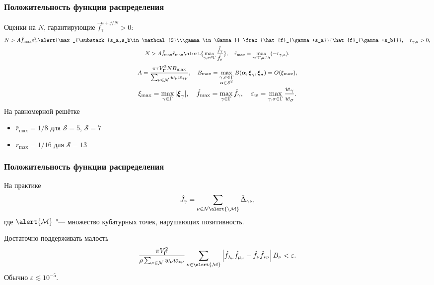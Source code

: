 \documentclass[mathserif]{beamer} %
\newcommand{\bxi}{\boldsymbol{\xi}}
\newcommand{\OO}[1]{O(#1)}
\newcommand{\Nu}{\mathcal{N}}
\newcommand{\Mu}{\mathcal{M}}
\renewcommand{\epsilon}{\varepsilon}
\begin{document}
\begin{frame}
    \frametitle{Положительность функции распределения}
    Оценки на \(N\), гарантирующие \(\hat{f}_\gamma^{n+j/N}>0\):
    \begin{gather*}
        N > A \hat{f}_{\max}\epsilon_w^2 \alert{\max_{\substack{s_a,s_b\in\mathcal{S}\\\gamma\in\Gamma}}
            \frac{\hat{f}_{\gamma+s_a}}{\hat{f}_{\gamma+s_b}}} , \quad r_{\gamma,a} > 0, \\
        N > A \hat{f}_{\max} \bar{r}_{\max} \alert{\max_{\gamma,\sigma\in\Gamma}\frac{\hat{f_\gamma}}{\hat{f_\sigma}}}, \quad
            \bar{r}_{\max} = \max_{\gamma\in\Gamma,a\in\Lambda}( -r_{\gamma,a} ).
    \end{gather*}
    \begin{gather*}
        \footnotesize
        A = \frac{\pi\tau V_\Gamma^2 N B_{\max}}{\sum_{\nu\in\Nu} w_{\nu}w_{*\nu}}, \quad
        B_{\max} = \max_{\substack{\gamma,\sigma\in\Gamma\\\boldsymbol{\alpha}\in S^2}}
            B(\boldsymbol{\alpha}, \bxi_{\gamma}, \bxi_{\sigma}) = \OO{\xi_{\max}}, \\
        \xi_{\max} = \max_{\gamma\in\Gamma}|\bxi_\gamma|, \quad
        \hat{f}_{\max} = \max_{\gamma\in\Gamma} \hat{f}_\gamma, \quad
        \epsilon_w = \max_{\gamma,\sigma\in\Gamma} \frac{w_\gamma}{w_\sigma}.
    \end{gather*}
    \pause
    На равномерной решётке
    \begin{itemize}
        \item \(\bar{r}_{\max}=1/8\) для \(\mathcal{S}=5\), \(\mathcal{S}=7\)
        \item \(\bar{r}_{\max}=1/16\) для \(\mathcal{S}=13\)
    \end{itemize}
\end{frame}

\begin{frame}
    \frametitle{Положительность функции распределения}
    На практике
    \begin{equation}
        \hat{J}_\gamma = \sum_{\nu\in\Nu\alert{\setminus\Mu}} \hat{\Delta}_{\gamma\nu},
    \end{equation}
    где \(\alert{\Mu}\) "--- множество кубатурных точек, нарушающих позитивность.
    \vspace{20pt}\pause

    Достаточно поддерживать малость
    \begin{equation}
        \frac{\pi V_\Gamma^2}{\rho\sum_{\nu\in\Nu} w_{\nu}w_{*\nu}}
        \sum_{\nu\in\alert{\Mu}} \left|
            \hat{f}_{\lambda_\nu}\hat{f}_{\mu_\nu} - \hat{f}_{\nu}\hat{f}_{*\nu}
        \right|B_\nu < \epsilon.
    \end{equation}
    Обычно \(\epsilon \lesssim 10^{-5}\).
\end{frame}
\end{document}

